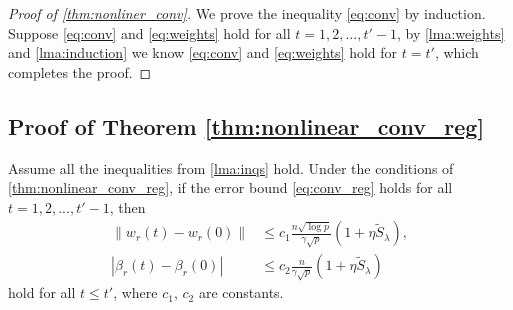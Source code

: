 \begin{proof}[Proof of \cref{thm:nonliner_conv}]
We prove the inequality \eqref{eq:conv} by induction. Suppose \eqref{eq:conv} and \eqref{eq:weights} hold for all $t=1,2,...,t'-1$, by \cref{lma:weights} and \cref{lma:induction} we know \eqref{eq:conv} and \eqref{eq:weights} hold for $t=t'$, which completes the proof.
\end{proof}

\subsection{Proof of Theorem \ref{thm:nonlinear_conv_reg}}

\begin{lemma}
\label{lma:weights_reg}
Assume all the inequalities from \cref{lma:inqs} hold. Under the conditions of \cref{thm:nonlinear_conv_reg}, if the error bound \eqref{eq:conv_reg} holds for all $t=1,2,...,t'-1$, then
\begin{equation}
\label{eq:weights_reg}
\begin{aligned}
    \|w_r(t)-w_r(0)\| &\leq c_1\frac{n\sqrt{\log p}}{\gamma\sqrt p}(1+\eta \tilde{S}_\lambda),\\
    |\beta_r(t)-\beta_r(0)| &\leq c_2\frac{n}{\gamma\sqrt p}(1+\eta \tilde{S}_\lambda)
\end{aligned}
\end{equation}
hold for all $t\leq t'$, where $c_1$, $c_2$ are constants.
\end{lemma}

